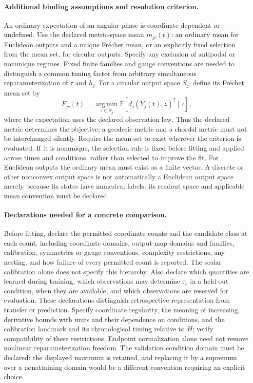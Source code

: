 \documentclass[11pt]{article}
\begin{document}
\paragraph{Additional binding assumptions and resolution criterion.} An ordinary expectation of an angular phase is coordinate-dependent or undefined. Use the declared metric-space mean $m_{jc}(t)$: an ordinary mean for Euclidean outputs and a unique Fr\'echet mean, or an explicitly fixed selection from the mean set, for circular outputs. Specify any exclusion of antipodal or nonunique regimes. Fixed finite families and gauge conventions are needed to distinguish a common timing factor from arbitrary simultaneous reparameterization of $\tau$ and $h_j$.
For a circular output space $S_j$, define its Fr\'echet mean set by
\[
 F_{jc}(t)=\operatorname*{arg\,min}_{z\in S_j}
 \mathbb{E}\!\left[d_j(Y_j(t),z)^2\mid c\right],
\]
where the expectation uses the declared observation law. Thus the declared metric determines the objective; a geodesic metric and a chordal metric must not be interchanged silently. Require the mean set to exist wherever the criterion is evaluated. If it is nonunique, the selection rule is fixed before fitting and applied across times and conditions, rather than selected to improve the fit. For Euclidean outputs the ordinary mean must exist as a finite vector. A discrete or other nonconvex output space is not automatically a Euclidean output space merely because its states have numerical labels; its readout space and applicable mean convention must be declared.

\paragraph{Declarations needed for a concrete comparison.} Before fitting, declare the permitted coordinate counts and the candidate class at each count, including coordinate domains, output-map domains and families, calibration, symmetries or gauge conventions, complexity restrictions, any nesting, and how failure of every permitted count is reported. The scalar calibration alone does not specify this hierarchy. Also declare which quantities are learned during training, which observations may determine $\tau_c$ in a held-out condition, when they are available, and which observations are reserved for evaluation. These declarations distinguish retrospective representation from transfer or prediction. Specify coordinate regularity, the meaning of increasing, derivative bounds with units and their dependence on conditions, and the calibration landmark and its chronological timing relative to $H$; verify compatibility of these restrictions. Endpoint normalization alone need not remove nonlinear reparameterization freedom. The validation condition domain must be declared: the displayed maximum is retained, and replacing it by a supremum over a nonattaining domain would be a different convention requiring an explicit choice.
\end{document}
